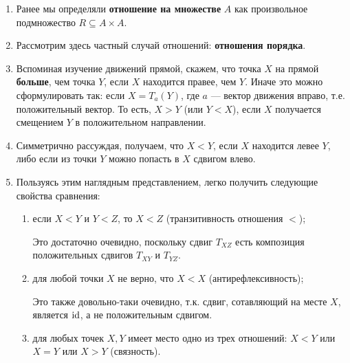 \begin{enumerate}
\item Ранее мы определяли \textbf{отношение на множестве} $A$ как произвольное подмножество $R\subseteq A\times A$.
\item Рассмотрим здесь частный случай отношений: \textbf{отношения порядка}.
\item Вспоминая изучение движений прямой, скажем, что точка $X$ на прямой \textbf{больше}, чем точка $Y$, если $X$ находится правее, чем $Y$. Иначе это можно сформулировать так: если $X=T_a(Y)$, где $a$ --- вектор движения вправо, т.е. положительный вектор. То есть, $X>Y$ (или $Y<X$), если $X$ получается смещением $Y$ в положительном направлении.
\item Симметрично рассуждая, получаем, что $X<Y$, если $X$ находится левее $Y$, либо если из точки $Y$ можно попасть в $X$ сдвигом влево.
\item Пользуясь этим наглядным представлением, легко получить следующие свойства сравнения:
\begin{enumerate}[{\bf Rel1}]
\item если $X<Y$ и $Y<Z$, то $X<Z$ (транзитивность отношения $<$);

Это достаточно очевидно, поскольку сдвиг $T_{XZ}$ есть композиция положительных сдвигов $T_{XY}$ и $T_{YZ}$.
\item для любой точки $X$ не верно, что $X<X$ (антирефлексивность);

Это также довольно-таки очевидно, т.к. сдвиг, сотавляющий на месте $X$, является $\mathrm{id}$, а не положительным сдвигом.
\item для любых точек $X,Y$ имеет место одно из трех отношений: $X<Y$ или $X=Y$ или $X>Y$ (связность).


\end{enumerate}
\end{enumerate}
